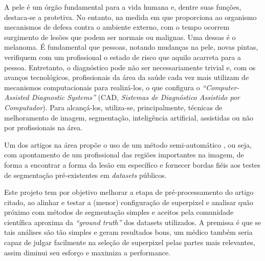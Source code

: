 A pele é um órgão fundamental para a vida humana e, dentre suas funções, destaca-se a protetiva.
No entanto, na medida em que proporciona ao organismo mecanismos de defesa contra o ambiente externo,
com o tempo ocorrem surgimento de lesões que podem ser normais ou malignas. Uma dessas é o melanoma.
É fundamental que pessoas, notando mudanças na pele, novas pintas, verifiquem com um profissional o
estado de risco que aquilo acarreta para a pessoa. Entretanto, o diagnóstico pode não ser necessariamente
trivial e, com os avanços tecnológicos, profissionais da área da saúde cada vez mais utilizam de mecanismos
computacionais para realizá-los, o que configura o \emph{``Computer-Assisted Diagnostic Systems''} (CAD, \emph{Sistemas de Diagnóstico Assistido por Computador}). Para alcançá-los, utiliza-se, principalmente, técnicas de melhoramento de imagem, segmentação, inteligência artificial, assistidas ou não por profissionais na área.

Um dos artigos na área propõe o uso de um método semi-automático \cite{santos2020skin}, ou seja, com apontamento de um profissional das regiões importantes na imagem, de forma a encontrar a forma da lesão em específico e fornecer bordas fiéis aos testes de segmentação pré-existentes em \textit{datasets} públicos.

Este projeto tem por objetivo melhorar a etapa de pré-processamento do artigo \cite{santos2020skin} citado,
ao alinhar e testar a (menor) configuração de superpixel e analisar quão próximo com métodos de segmentação
simples e aceitos pela comunidade científica aproxima da \emph{``ground truth''} dos datasets utilizados. A
premissa é que se tais análises são tão simples e geram resultados bons, um médico também seria capaz de julgar
facilmente na seleção de superpixel pelas partes mais relevantes, assim diminui seu esforço e maximiza a performance.
